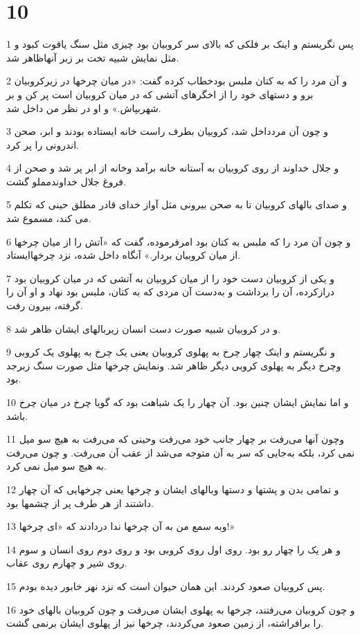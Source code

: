 \chapter{10}

\par 1 پس نگریستم و اینک بر فلکی که بالای سر کروبیان بود چیزی مثل سنگ یاقوت کبود و مثل نمایش شبیه تخت بر زبر آنهاظاهر شد.
\par 2 و آن مرد را که به کتان ملبس بودخطاب کرده گفت: «در میان چرخها در زیرکروبیان برو و دستهای خود را از اخگرهای آتشی که در میان کروبیان است پر کن و بر شهربپاش.» و او در نظر من داخل شد.
\par 3 و چون آن مردداخل شد، کروبیان بطرف راست خانه ایستاده بودند و ابر، صحن اندرونی را پر کرد.
\par 4 و جلال خداوند از روی کروبیان به آستانه خانه برآمد وخانه از ابر پر شد و صحن از فروغ جلال خداوندمملو گشت.
\par 5 و صدای بالهای کروبیان تا به صحن بیرونی مثل آواز خدای قادر مطلق حینی که تکلم می کند، مسموع شد.
\par 6 و چون آن مرد را که ملبس به کتان بود امرفرموده، گفت که «آتش را از میان چرخها از میان کروبیان بردار.» آنگاه داخل شده، نزد چرخهاایستاد.
\par 7 و یکی از کروبیان دست خود را از میان کروبیان به آتشی که در میان کروبیان بود درازکرده، آن را برداشت و به‌دست آن مردی که به کتان، ملبس بود نهاد و او آن را گرفته، بیرون رفت.
\par 8 و در کروبیان شبیه صورت دست انسان زیربالهای ایشان ظاهر شد.
\par 9 و نگریستم و اینک چهار چرخ به پهلوی کروبیان یعنی یک چرخ به پهلوی یک کروبی وچرخ دیگر به پهلوی کروبی دیگر ظاهر شد. ونمایش چرخها مثل صورت سنگ زبرجد بود.
\par 10 و اما نمایش ایشان چنین بود. آن چهار را یک شباهت بود که گویا چرخ در میان چرخ باشد.
\par 11 وچون آنها می‌رفت بر چهار جانب خود می‌رفت وحینی که می‌رفت به هیچ سو میل نمی کرد، بلکه به‌جایی که سر به آن متوجه می‌شد از عقب آن می‌رفت. و چون می‌رفت به هیچ سو میل نمی کرد.
\par 12 و تمامی بدن و پشتها و دستها وبالهای ایشان و چرخها یعنی چرخهایی که آن چهار داشتند از هر طرف پر از چشمها بود.
\par 13 وبه سمع من به آن چرخها ندا در‌دادند که «ای چرخها!»
\par 14 و هر یک را چهار رو بود. روی اول روی کروبی بود و روی دوم روی انسان و سوم روی شیر و چهارم روی عقاب.
\par 15 پس کروبیان صعود کردند. این همان حیوان است که نزد نهر خابور دیده بودم.
\par 16 و چون کروبیان می‌رفتند، چرخها به پهلوی ایشان می‌رفت و چون کروبیان بالهای خود را برافراشته، از زمین صعود می‌کردند، چرخها نیز از پهلوی ایشان برنمی گشت.
